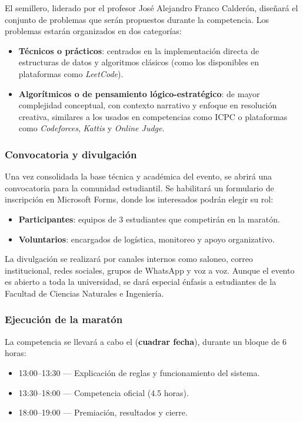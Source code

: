 \documentclass{article}
\begin{document}
El semillero, liderado por el profesor José Alejandro Franco Calderón, diseñará el conjunto de problemas que serán propuestos durante la competencia. Los problemas estarán organizados en dos categorías:

\begin{itemize}
  \item \textbf{Técnicos o prácticos}: centrados en la implementación directa de estructuras de datos y algoritmos clásicos (como los disponibles en plataformas como \textit{LeetCode}\cite{leetcode}).
  \item \textbf{Algorítmicos o de pensamiento lógico-estratégico}: de mayor complejidad conceptual, con contexto narrativo y enfoque en resolución creativa, similares a los usados en competencias como ICPC o plataformas como \textit{Codeforces}, \textit{Kattis} y \textit{Online Judge}.
\end{itemize}

\subsubsection{Convocatoria y divulgación}

Una vez consolidada la base técnica y académica del evento, se abrirá una convocatoria para la comunidad estudiantil. Se habilitará un formulario de inscripción en Microsoft Forms, donde los interesados podrán elegir su rol:

\begin{itemize}
  \item \textbf{Participantes}: equipos de 3 estudiantes que competirán en la maratón.
  \item \textbf{Voluntarios}: encargados de logística, monitoreo y apoyo organizativo.
\end{itemize}

La divulgación se realizará por canales internos como saloneo, correo institucional, redes sociales, grupos de WhatsApp y voz a voz. Aunque el evento es abierto a toda la universidad, se dará especial énfasis a estudiantes de la Facultad de Ciencias Naturales e Ingeniería.


\subsubsection{Ejecución de la maratón}
La competencia se llevará a cabo el (\textbf{cuadrar fecha}), durante un bloque de 6 horas:

\begin{itemize}
  \item 13:00–13:30 — Explicación de reglas y funcionamiento del sistema.
  \item 13:30–18:00 — Competencia oficial (4.5 horas).
  \item 18:00–19:00 — Premiación, resultados y cierre.
\end{itemize}
\end{document}
